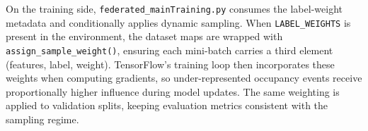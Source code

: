 On the training side, \texttt{federated\_mainTraining.py} consumes the label-weight metadata and conditionally applies dynamic sampling. When \texttt{LABEL\_WEIGHTS} is present in the environment, the dataset maps are wrapped with \texttt{assign\_sample\_weight()}, ensuring each mini-batch carries a third element (features, label, weight). TensorFlow’s training loop then incorporates these weights when computing gradients, so under-represented occupancy events receive proportionally higher influence during model updates. The same weighting is applied to validation splits, keeping evaluation metrics consistent with the sampling regime.

